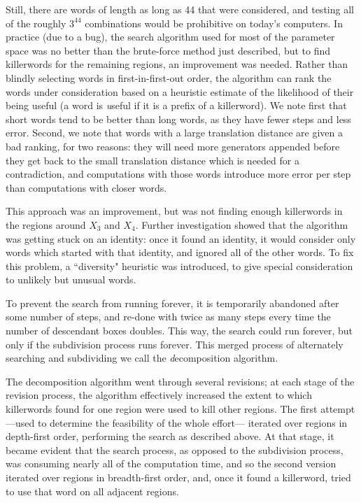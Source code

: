 \begin{remark}
\begin{remark}
Still, there are words of length as long as 44 that were considered, and testing all of the roughly $3^{44}$ 
combinations would be prohibitive on today's computers.  In practice 
(due to a bug), the search algorithm used for most of the parameter
space was no better than the brute-force method just described, but to find 
killerwords for the remaining regions, an improvement was needed.  
Rather than blindly selecting words in first-in-first-out order, 
the algorithm can
rank the words under consideration based on a heuristic estimate of 
the likelihood of their being useful (a word is {\textit useful} if it is a prefix of a killerword).  
We note first that short words tend to be better than 
long words, as they have fewer steps and less error.
Second, we note that words 
with a large translation distance are given a bad ranking, for two reasons: 
they will need more generators appended before they get back to the 
small translation distance which is needed for a contradiction, and
 computations with those words introduce more error per step than 
computations with closer words.  

This approach was an improvement, but was not finding enough killerwords in the regions 
around $X_3$ and $X_4$.  Further investigation showed that the 
algorithm was getting stuck on an identity: once it found an identity, 
it would consider only words which started with that identity, and 
ignored all of the other words.  To fix this problem, a ``diversity" 
heuristic was introduced, to give special consideration to unlikely but 
unusual words.

To prevent the search from running forever, it is 
temporarily abandoned after some number of steps, and re-done 
with twice as many steps every time the number of descendant boxes 
doubles.  This way, the search could run forever, but only if
the subdivision process runs forever. 
This merged process of alternately searching and subdividing we
call the {\textit decomposition algorithm}.

The decomposition algorithm went through several revisions; at each stage
of the revision process, 
the algorithm effectively increased the extent to which killerwords 
found for one region were used to kill other regions.  The first 
attempt---used to determine the feasibility of the whole effort--- 
iterated over regions in depth-first order, performing the search as 
described above.
At that stage, it became evident that the search process, as 
opposed to the subdivision process, 
was consuming nearly all of the computation time, and so the second 
version iterated over regions in breadth-first order, and, once it 
found a killerword, tried to use that word on all adjacent regions.


\end{remark}
\end{remark}

